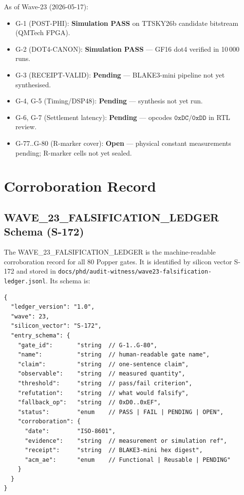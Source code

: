 As of Wave-23 (2026-05-17):
\begin{itemize}
  \item G-1 (POST-PHI): \textbf{Simulation PASS} on TTSKY26b candidate
    bitstream (QMTech FPGA).
  \item G-2 (DOT4-CANON): \textbf{Simulation PASS} — GF16 dot4 verified
    in 10\,000 runs.
  \item G-3 (RECEIPT-VALID): \textbf{Pending} — BLAKE3-mini pipeline
    not yet synthesised.
  \item G-4, G-5 (Timing/DSP48): \textbf{Pending} — synthesis not yet run.
  \item G-6, G-7 (Settlement latency): \textbf{Pending} — opcodes
    $\mathtt{0xDC/0xDD}$ in RTL review.
  \item G-77..G-80 (R-marker cover): \textbf{Open} — physical constant
    measurements pending; R-marker cells not yet sealed.
\end{itemize}

\section{Corroboration Record}
\label{sec74:corroboration}

\subsection{WAVE\_23\_FALSIFICATION\_LEDGER Schema (S-172)}
\label{sec74:ledger-schema}

The WAVE\_23\_FALSIFICATION\_LEDGER is the machine-readable corroboration
record for all 80 Popper gates.  It is identified by silicon vector S-172
and stored in \texttt{docs/phd/audit-witness/wave23-falsification-ledger.jsonl}.
Its schema is:

\begin{verbatim}
{
  "ledger_version": "1.0",
  "wave": 23,
  "silicon_vector": "S-172",
  "entry_schema": {
    "gate_id":       "string  // G-1..G-80",
    "name":          "string  // human-readable gate name",
    "claim":         "string  // one-sentence claim",
    "observable":    "string  // measured quantity",
    "threshold":     "string  // pass/fail criterion",
    "refutation":    "string  // what would falsify",
    "fallback_op":   "string  // 0xD0..0xEF",
    "status":        "enum    // PASS | FAIL | PENDING | OPEN",
    "corroboration": {
      "date":        "ISO-8601",
      "evidence":    "string  // measurement or simulation ref",
      "receipt":     "string  // BLAKE3-mini hex digest",
      "acm_ae":      "enum    // Functional | Reusable | PENDING"
    }
  }
}
\end{verbatim}

